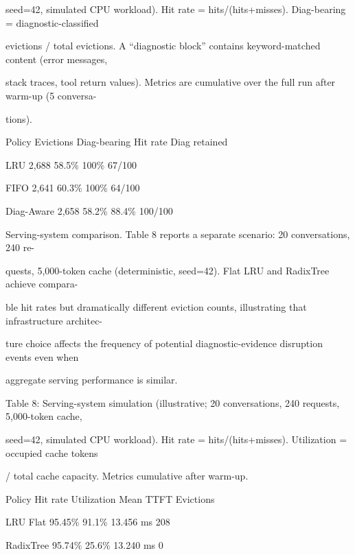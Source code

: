 \begin{flushleft}
\noindent seed=42, simulated CPU workload). Hit rate = hits/(hits+misses). Diag-bearing = diagnostic-classified\par
\noindent evictions / total evictions. A “diagnostic block” contains keyword-matched content (error messages,\par
\noindent stack traces, tool return values). Metrics are cumulative over the full run after warm-up (5 conversa-\par
\noindent tions).\par
\par\smallskip
\noindent  Policy Evictions Diag-bearing Hit rate Diag retained\par
\noindent  LRU 2,688 58.5\% 100\% 67/100\par
\noindent  FIFO 2,641 60.3\% 100\% 64/100\par
\noindent  Diag-Aware 2,658 58.2\% 88.4\% 100/100\par
\par\smallskip
\par\smallskip
\par\smallskip
\noindent Serving-system comparison. Table 8 reports a separate scenario: 20 conversations, 240 re-\par
\noindent quests, 5,000-token cache (deterministic, seed=42). Flat LRU and RadixTree achieve compara-\par
\noindent ble hit rates but dramatically different eviction counts, illustrating that infrastructure architec-\par
\noindent ture choice affects the frequency of potential diagnostic-evidence disruption events even when\par
\noindent aggregate serving performance is similar.\par
\par\smallskip
\noindent Table 8: Serving-system simulation (illustrative; 20 conversations, 240 requests, 5,000-token cache,\par
\noindent seed=42, simulated CPU workload). Hit rate = hits/(hits+misses). Utilization = occupied cache tokens\par
\noindent / total cache capacity. Metrics cumulative after warm-up.\par
\par\smallskip
\noindent  Policy Hit rate Utilization Mean TTFT Evictions\par
\noindent  LRU Flat 95.45\% 91.1\% 13.456 ms 208\par
\noindent  RadixTree 95.74\% 25.6\% 13.240 ms 0\par

\end{flushleft}
